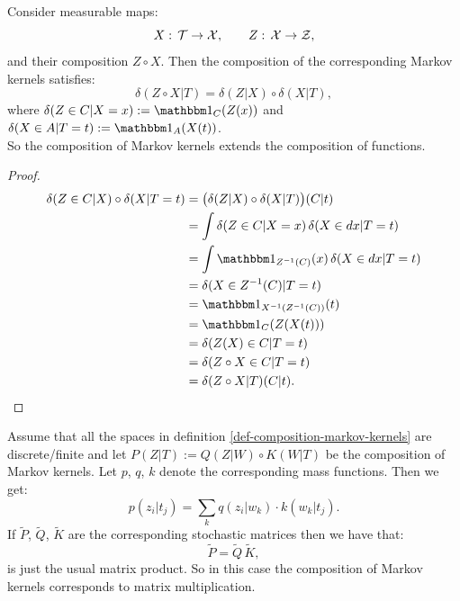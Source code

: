\begin{Rem}\label{deterministic-mk-composition}
    Consider measurable maps:
    \[ X:\, \mathcal{T} \to \mathcal{X},\qquad Z:\, \mathcal{X} \to \mathcal{Z}, \]
    and their composition $Z \circ X$. 
    Then the composition of the corresponding Markov kernels satisfies:
    \[  \delta(Z\circ X|T)  = \delta(Z|X) \circ \delta(X|T), \]
    where $\delta(Z \in C|X=x) := \I_C(Z(x))$ and $\delta(X \in A|T=t) := \I_A(X(t))$.\\
    So the composition of Markov kernels extends the composition of functions.
    \begin{proof}
        \begin{align*}
            \delta(Z \in C|X) \circ \delta(X|T=t) 
          & = \big(\delta(Z|X) \circ \delta(X|T)\big)(C|t) \\
        & = \int \delta(Z \in C| X=x) \, \delta(X \in dx|T=t)\\
                                             & = \int \I_{Z^{-1}(C)}(x)\, \delta(X \in dx|T=t)\\
                                             & = \delta(X \in Z^{-1}(C)|T=t)\\
                                             & = \I_{X^{-1}\lp Z^{-1}(C)\rp }(t)\\
                                             & = \I_C(Z(X(t))) \\
                                             & = \delta(Z(X) \in C|T=t)\\
                                             & = \delta(Z \circ X \in C|T=t)\\
                                             & = \delta(Z \circ X|T)(C|t).
        \end{align*}
    \end{proof}
\end{Rem}

\begin{Eg}
    Assume that all the spaces in definition \ref{def-composition-markov-kernels} are discrete/finite and let $P(Z|T):=Q(Z|W) \circ K(W|T)$ be the composition of Markov kernels.
    Let $p$, $q$, $k$ denote the corresponding mass functions. Then we get:
    \[ p(z_i|t_j) = \sum_k q(z_i|w_k) \cdot k(w_k|t_j).  \]
    If $\tilde P$, $\tilde Q$, $\tilde K$ are the corresponding stochastic matrices then we have that:
    \[  \tilde P = \tilde Q \, \tilde K,\]
    is just the usual matrix product. So in this case the composition of Markov kernels corresponds to matrix multiplication.
\end{Eg}

